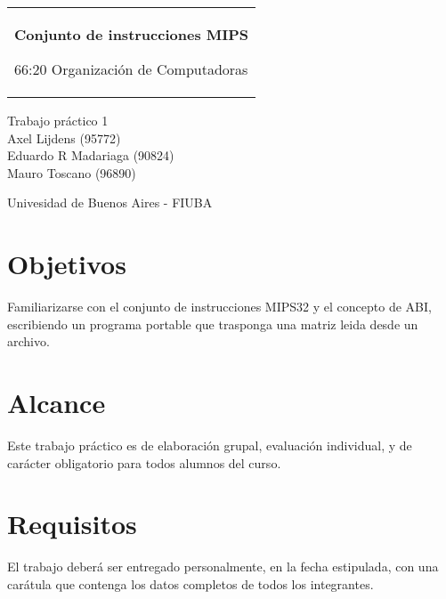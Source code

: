 \documentclass[11pt,a4paper]{article}
\begin{document}

\begin{titlepage}
  \noindent%
  \begin{tabular}{@{}p{\textwidth}@{}}
    \vspace{0.2cm}
    \begin{center}
    \Huge{\textbf{
      Conjunto de instrucciones MIPS
    }}
    \end{center}
    \begin{center}
      \Large{
         66:20 Organizaci\'on de Computadoras
      }
    \end{center}
    \vspace{0.2cm}\\
  \end{tabular}
  \vspace{4 cm}
  \begin{center}
    {\large
      Trabajo práctico 1
    }\\
    \vspace{0.6cm}
    {\Large
      Axel Lijdens (95772)\\
      Eduardo R Madariaga (90824)\\
      Mauro Toscano (96890)
    }
  \end{center}
  \vfill
  \begin{center}
  Univesidad de Buenos Aires - FIUBA
  \end{center}
\end{titlepage}


\tableofcontents
\pagebreak

\section{Objetivos}

Familiarizarse con el conjunto de instrucciones MIPS32 y el concepto de
ABI, escribiendo un programa portable que trasponga una matriz leida desde un archivo.

\section{Alcance}

Este trabajo práctico es de elaboración grupal, evaluación individual, y de carácter obligatorio para todos alumnos del curso.

\section{Requisitos}
El trabajo deber\'a ser entregado personalmente, en la fecha estipulada, con una car\'atula que contenga los datos completos de todos los integrantes.\\
\end{document}
